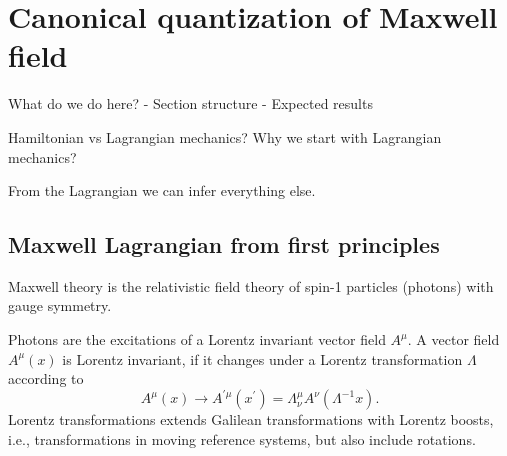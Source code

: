 \section{Canonical quantization of Maxwell field}

What do we do here?
- Section structure
- Expected results

Hamiltonian vs Lagrangian mechanics?
Why we start with Lagrangian mechanics?

From the Lagrangian we can infer everything else.

\subsection{Maxwell Lagrangian from first principles}

Maxwell theory is the relativistic field theory of spin-1 particles (photons) with gauge symmetry.

Photons are the excitations of a Lorentz invariant vector field $A^\mu$.
A vector field $A^\mu(x)$ is Lorentz invariant, if it changes under a Lorentz transformation $\Lambda$ according to~\cite[p.~37]{Peskin1995}
\begin{equation}
	A^\mu(x)
	\to
	A^{\prime\mu}(x^\prime)
	=
	\Lambda^\mu_\nu
	A^\nu(\Lambda^{-1}x)
	.
\end{equation}
Lorentz transformations extends Galilean transformations with Lorentz boosts, i.e., transformations in moving reference systems, but also include rotations.

